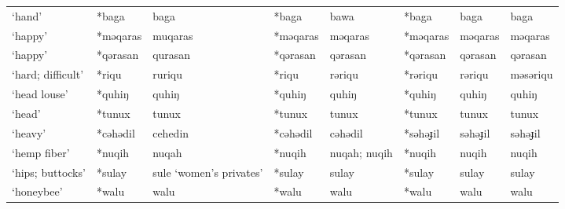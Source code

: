 \begin{landscape}
\begin{longtable}[c]{@{}p{3cm}<{\raggedright}p{2.75cm}<{\raggedright}p{2.75cm}<{\raggedright}p{2.75cm}<{\raggedright}p{2.75cm}<{\raggedright}p{2.75cm}<{\raggedright}p{2.75cm}<{\raggedright}p{2.75cm}<{\raggedright}@{}}
`hand'                                               & *baga        & baga                          & *baga          & bawa                       & *baga            & baga                     & baga                              \\
`happy'                                              & *məqaras     & muqaras                       & *məqaras       & məqaras                    & *məqaras         & məqaras                  & məqaras                           \\
`happy'                                              & *qərasan     & qurasan                       & *qərasan       & qərasan                    & *qərasan         & qərasan                  & qərasan                           \\
`hard; difficult'                                    & *riqu        & ruriqu                        & *riqu          & rəriqu                     & *rəriqu          & rəriqu                   & məsəriqu                          \\
`head louse'                                         & *quhiŋ       & quhiŋ                         & *quhiŋ         & quhiŋ                      & *quhiŋ           & quhiŋ                    & quhiŋ                             \\
`head'                                               & *tunux       & tunux                         & *tunux         & tunux                      & *tunux           & tunux                    & tunux                             \\
`heavy'                                              & *cəhədil     & cehedin                       & *cəhədil       & cəhədil                    & *səhəɟil         & səhəɟil                  & səhəɟil                           \\
`hemp fiber'                                         & *nuqih       & nuqah                         & *nuqih         & nuqah; nuqih               & *nuqih           & nuqih                    & nuqih                             \\
`hips; buttocks'                                     & *sulay       & sule `women's privates'       & *sulay         & sulay                      & *sulay           & sulay                    & sulay                             \\
`honeybee'                                           & *walu        & walu                          & *walu          & walu                       & *walu            & walu                     & walu                              \\

\end{longtable}
\end{landscape}
